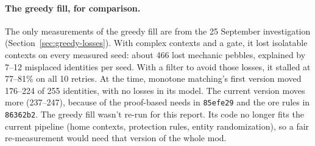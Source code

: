 \paragraph{The greedy fill, for comparison.} The only measurements of the greedy fill are from the 25 September investigation (Section~\ref{sec:greedy-losses}). With complex contexts and a gate, it lost isolatable contexts on every measured seed: about 466 lost mechanic pebbles, explained by 7--12 misplaced identities per seed. With a filter to avoid those losses, it stalled at 77--81\% on all 10 retries. At the time, monotone matching's first version moved 176--224 of 255 identities, with no losses in its model. The current version moves more (237--247), because of the proof-based needs in \texttt{85efe29} and the ore rules in \texttt{86362b2}. The greedy fill wasn't re-run for this report. Its code no longer fits the current pipeline (home contexts, protection rules, entity randomization), so a fair re-measurement would need that version of the whole mod.

